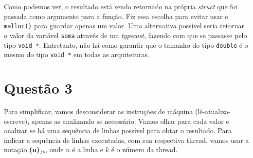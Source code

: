 \documentclass{article}
\begin{document}
Como podemos ver, o resultado está sendo retornado na própria \emph{struct} que foi passada como
argumento para a função. Fiz essa escolha para evitar usar o \texttt{malloc()} para guardar apenas
um valor. Uma alternativa possível seria retornar o valor da variável \texttt{soma} através de um
\emph{typecast}, fazendo com que se passasse pelo tipo \texttt{void *}. Entretanto, não há como garantir
que o tamanho do tipo \texttt{double} é o mesmo do tipo \texttt{void *} em todas as arquiteturas.

\section*{Questão 3}

Para simplificar, vamos desconsiderar as instruções de máquina (lê-atualiza-escreve), apenas as analizando
se necessário. Vamos olhar para cada valor e analizar se há uma sequência de linhas possível para obtar o
resultado. Para indicar a sequência de linhas executadas, com sua respectiva thread, vamos usar a notação
\textbf{(n)}$_{Tk}$, onde $n$ é a linha e $k$ é o número da thread.
\end{document}
